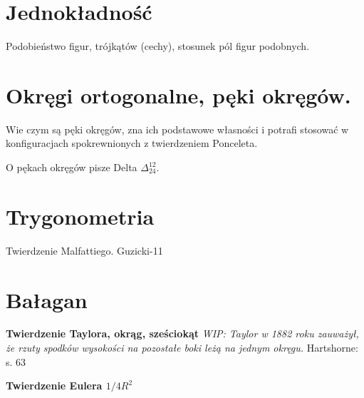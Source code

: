 %

\section{Jednokładność}
Podobieństwo figur, trójkątów (cechy), stosunek pól figur podobnych.


\section{Okręgi ortogonalne, pęki okręgów.}
Wie czym są pęki okręgów, zna ich podstawowe własności i potrafi stosować w konfiguracjach spokrewnionych z twierdzeniem Ponceleta.   

O pękach okręgów pisze Delta $\Delta_{24}^{12}$.



\section{Trygonometria}


Twierdzenie Malfattiego.
Guzicki-11

\section{Bałagan}

\textbf{Twierdzenie Taylora, okrąg, sześciokąt}
{
    \emph{WIP: Taylor w 1882 roku zauważył, że rzuty spodków wysokości na pozostałe boki leżą na jednym okręgu.}
	Hartshorne: s. 63
}

\textbf{Twierdzenie Eulera $1/4R^2$}



%